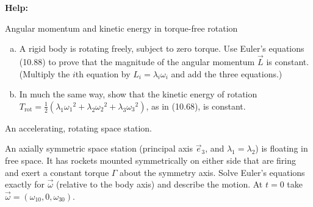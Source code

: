 \documentclass[11pt,letterpaper,boxed]{../hmcpsetrhino}
\newcommand{\half}{\frac{1}{2}}
\begin{document}
\textbf{Help:}

\begin{problem}[i]
Angular momentum and kinetic energy in torque-free rotation

\begin{problem}[10.40]
\begin{enumerate}[(a)]
\item A rigid body is rotating freely, subject to zero torque. Use Euler's equations (10.88) to prove that the magnitude of the angular momentum $\vec L$ is constant. (Multiply the $i$th equation by $L_i = \lambda_i \omega_i$ and add the three equations.) 
\item In much the same way, show that the kinetic energy of rotation $T_{\text{rot}} = \half (\lambda_1 {\omega_1}^2 + \lambda_2 {\omega_2} ^2 +\lambda_3 {\omega_3}^2)$, as in (10.68), is constant.


\end{enumerate}
\end{problem}
\end{problem}
\begin{solution}


\vfill
\end{solution}

\newpage 

\begin{problem}[ii]
An accelerating, rotating space station.

\begin{problem}[10.44]
An axially symmetric space station (principal axis $\vec e_3$, and $\lambda_1 = \lambda_2$) is floating in free space. It has rockets mounted symmetrically on either side that are firing and exert a constant torque $\Gamma$ about the symmetry axis. Solve Euler's equations exactly for $\vec \omega$ (relative to the body axis) and describe the motion. At $t=0$ take $\vec \omega = (\omega_{10}, 0 , \omega_{30})$.

\end{problem}
\end{problem}
\begin{solution}


\vfill
\end{solution}

\newpage 
\end{document}
